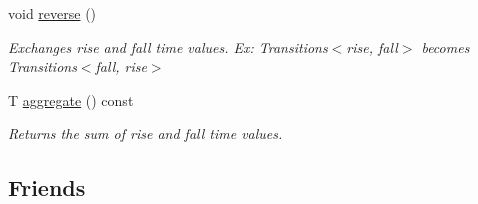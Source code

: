 \begin{DoxyCompactItemize}
void \hyperlink{classTransitions_ae547df9c8b8d6191aa95ca8f3e850605}{reverse} ()
\begin{DoxyCompactList}\small\item\em Exchanges rise and fall time values. Ex\-: Transitions$<$rise, fall$>$ becomes Transitions$<$fall, rise$>$ \end{DoxyCompactList}\item 
T \hyperlink{classTransitions_ab89e328a131f4ccf8882c67a30d6726c}{aggregate} () const 
\begin{DoxyCompactList}\small\item\em Returns the sum of rise and fall time values. \end{DoxyCompactList}\end{DoxyCompactItemize}
\subsection*{Friends}
